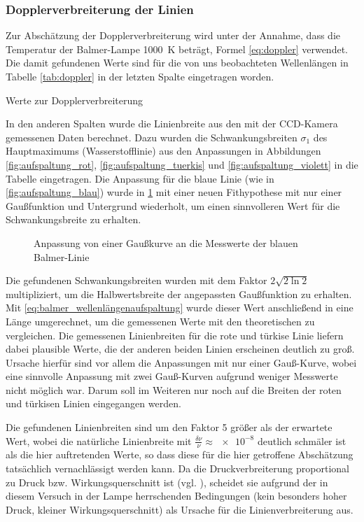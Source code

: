 \documentclass[11pt, a4paper]{article}
\numberwithin{equation}{section}
\begin{document}
\subsubsection{Dopplerverbreiterung der Linien}
Zur Abschätzung der Dopplerverbreiterung wird unter der Annahme, dass die Temperatur der Balmer-Lampe \SI{1000}{\kelvin} beträgt, Formel \eqref{eq:doppler} verwendet.
Die damit gefundenen Werte sind für die von uns beobachteten Wellenlängen in Tabelle \ref{tab:doppler} in der letzten Spalte eingetragen worden.
\begin{table}[h]
\centering
\resizebox{\columnwidth}{!}{%
}
\caption{Werte zur Dopplerverbreiterung}
\label{tab:doppler}
\end{table}
In den anderen Spalten wurde die Linienbreite aus den mit der CCD-Kamera gemessenen Daten berechnet.
Dazu wurden die Schwankungsbreiten $\sigma_1$ des Hauptmaximums (Wasserstofflinie) aus den Anpassungen in Abbildungen \ref{fig:aufspaltung_rot}, \ref{fig:aufspaltung_tuerkis} und \ref{fig:aufspaltung_violett} in die Tabelle eingetragen.
Die Anpassung für die blaue Linie (wie in \ref{fig:aufspaltung_blau}) wurde in \ref{fig:doppler_blau} mit einer neuen Fithypothese mit nur einer Gaußfunktion und Untergrund wiederholt, um einen sinnvolleren Wert für die Schwankungsbreite zu erhalten.
\begin{figure}[h]
\centering

\caption{Anpassung von einer Gaußkurve an die Messwerte der blauen Balmer-Linie}
\label{fig:doppler_blau}
\end{figure}
Die gefundenen Schwankungsbreiten wurden mit dem Faktor $2\sqrt{2\ln2}$ multipliziert, um die Halbwertsbreite der angepassten Gaußfunktion zu erhalten.
Mit \eqref{eq:balmer_wellenlängenaufspaltung} wurde dieser Wert anschließend in eine Länge umgerechnet, um die gemessenen Werte mit den theoretischen zu vergleichen.
Die gemessenen Linienbreiten für die rote und türkise Linie liefern dabei plausible Werte, die der anderen beiden Linien erscheinen deutlich zu groß.
Ursache hierfür sind vor allem die Anpassungen mit nur einer Gauß-Kurve, wobei eine sinnvolle Anpassung mit zwei Gauß-Kurven aufgrund weniger Messwerte nicht möglich war.
Darum soll im Weiteren nur noch auf die Breiten der roten und türkisen Linien eingegangen werden.

Die gefundenen Linienbreiten sind um den Faktor \num{5} größer als der erwartete Wert, wobei die natürliche Linienbreite mit $\frac{\delta\nu}{\nu}\approx \num{e-8}$ deutlich schmäler ist als die hier auftretenden Werte, so dass diese für die hier getroffene Abschätzung tatsächlich vernachlässigt werden kann.
Da die Druckverbreiterung proportional zu Druck bzw. Wirkungsquerschnitt ist (vgl. \cite{gerthsen}), scheidet sie aufgrund der in diesem Versuch in der Lampe herrschenden Bedingungen (kein besonders hoher Druck, kleiner Wirkungsquerschnitt) als Ursache für die Linienverbreiterung aus.
\end{document}
